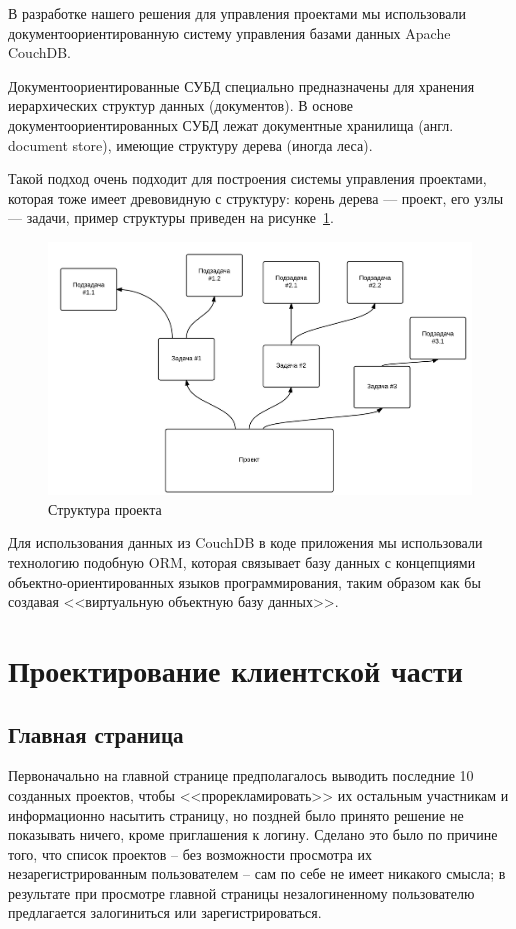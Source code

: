 \documentclass[a4paper, 14pt]{extarticle}
\begin{document}
В разработке нашего решения для управления проектами мы использовали документоориентированную
систему управления базами данных Apache CouchDB.

Документоориентированные СУБД специально предназначены для хранения иерархических структур
данных (документов). В основе документоориентированных СУБД лежат документные хранилища (англ. document store),
имеющие структуру дерева (иногда леса).

Такой подход очень подходит для построения системы управления проектами, которая тоже имеет древовидную с структуру:
корень дерева --- проект, его узлы --- задачи, пример структуры приведен на рисунке~\ref{fig:project_tree}.

\begin{figure}[!htb]
  \centering
    \includegraphics[scale=0.2]{../slides/images/test_tree.png}
    \caption{Структура проекта}
    \label{fig:project_tree}
\end{figure}

Для использования данных из CouchDB в коде приложения мы использовали технологию подобную ORM,
которая связывает базу данных с концепциями объектно-ориентированных языков программирования,
таким образом как бы создавая <<виртуальную объектную базу данных>>.

\newpage


\section{Проектирование клиентской части}
\subsection{Главная страница}
Первоначально на главной странице предполагалось выводить последние 10 созданных проектов, чтобы <<прорекламировать>> их остальным участникам и информационно насытить страницу, но поздней было принято решение не показывать ничего, кроме приглашения к логину. Сделано это было по причине того, что список проектов -- без возможности просмотра их незарегистрированным пользователем -- сам по себе не имеет никакого смысла; в результате при просмотре главной страницы незалогиненному пользователю предлагается залогиниться или зарегистрироваться.
\end{document}
